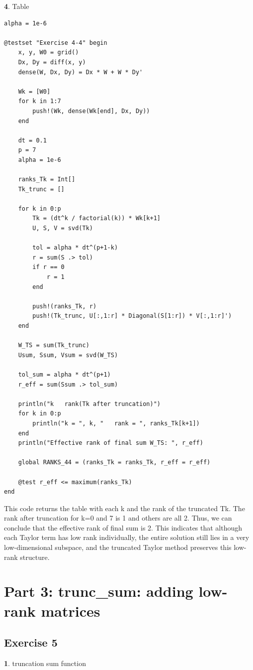 \documentclass[11pt]{article}
\begin{document}
\vspace{1.5em}
\textbf{4}. Table

\begin{lstlisting}
alpha = 1e-6

@testset "Exercise 4-4" begin
    x, y, W0 = grid()
    Dx, Dy = diff(x, y)
    dense(W, Dx, Dy) = Dx * W + W * Dy'

    Wk = [W0]
    for k in 1:7
        push!(Wk, dense(Wk[end], Dx, Dy))
    end

    dt = 0.1
    p = 7
    alpha = 1e-6

    ranks_Tk = Int[]
    Tk_trunc = []

    for k in 0:p
        Tk = (dt^k / factorial(k)) * Wk[k+1]
        U, S, V = svd(Tk)

        tol = alpha * dt^(p+1-k)
        r = sum(S .> tol)
        if r == 0
            r = 1
        end

        push!(ranks_Tk, r)
        push!(Tk_trunc, U[:,1:r] * Diagonal(S[1:r]) * V[:,1:r]')
    end

    W_TS = sum(Tk_trunc)
    Usum, Ssum, Vsum = svd(W_TS)

    tol_sum = alpha * dt^(p+1)
    r_eff = sum(Ssum .> tol_sum)

    println("k   rank(Tk after truncation)")
    for k in 0:p
        println("k = ", k, "   rank = ", ranks_Tk[k+1])
    end
    println("Effective rank of final sum W_TS: ", r_eff)

    global RANKS_44 = (ranks_Tk = ranks_Tk, r_eff = r_eff)

    @test r_eff <= maximum(ranks_Tk)
end

\end{lstlisting}

This code returns the table with each k and the rank of the truncated Tk. The rank after truncation for k=0 and 7 is 1 and others are all 2. Thus, we can conclude that the effective rank of final sum is 2. This indicates that although each Taylor term has low rank individually, the entire solution still lies in a very low-dimensional subspace, and the truncated Taylor method preserves this low-rank structure.

\section*{Part 3: trunc\_sum: adding low-rank matrices}
\subsection*{Exercise 5}
\textbf{1}. truncation sum function
\end{document}
